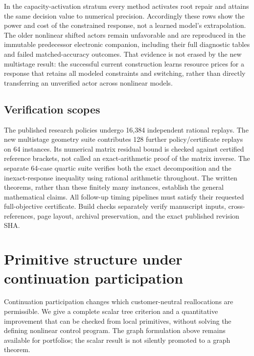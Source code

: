 \documentclass[11pt,letterpaper]{article}
\theoremstyle{definition}
\newcommand{\1}{\mathbf 1}
\begin{document}
In the capacity-activation stratum every method activates root repair and attains the same decision value to numerical precision. Accordingly these rows show the power and cost of the constrained response, not a learned model's extrapolation. The older nonlinear shifted actors remain unfavorable and are reproduced in the immutable predecessor electronic companion, including their full diagnostic tables and failed matched-accuracy outcomes. That evidence is not erased by the new multistage result: the successful current construction learns resource prices for a response that retains all modeled constraints and switching, rather than directly transferring an unverified actor across nonlinear models.

\subsection{Verification scopes}
The published research policies undergo 16,384 independent rational replays. The new multistage geometry suite contributes 128 further policy/certificate replays on 64 instances. Its numerical matrix residual bound is checked against certified reference brackets, not called an exact-arithmetic proof of the matrix inverse. The separate 64-case quartic suite verifies both the exact decomposition and the inexact-response inequality using rational arithmetic throughout. The written theorems, rather than these finitely many instances, establish the general mathematical claims. All follow-up timing pipelines must satisfy their requested full-objective certificate. Build checks separately verify manuscript inputs, cross-references, page layout, archival preservation, and the exact published revision SHA.



\section{Primitive structure under continuation participation}\label{sec:r10-tree}
Continuation participation changes which customer-neutral reallocations are permissible. We give a complete scalar tree criterion and a quantitative improvement that can be checked from local primitives, without solving the defining nonlinear control program. The graph formulation above remains available for portfolios; the scalar result is not silently promoted to a graph theorem.
\end{document}
